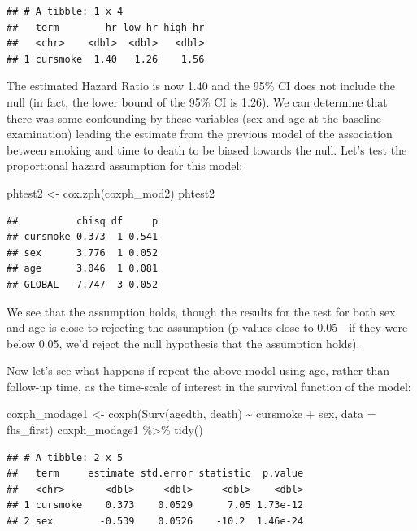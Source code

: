 \documentclass[
]{book}
\newenvironment{Shaded}{\begin{snugshade}}{\end{snugshade}}
\newcommand{\AttributeTok}[1]{\textcolor[rgb]{0.77,0.63,0.00}{#1}}
\newcommand{\FunctionTok}[1]{\textcolor[rgb]{0.00,0.00,0.00}{#1}}
\newcommand{\NormalTok}[1]{#1}
\newcommand{\OtherTok}[1]{\textcolor[rgb]{0.56,0.35,0.01}{#1}}
\newcommand{\SpecialCharTok}[1]{\textcolor[rgb]{0.00,0.00,0.00}{#1}}
\begin{document}
\begin{verbatim}
## # A tibble: 1 x 4
##   term        hr low_hr high_hr
##   <chr>    <dbl>  <dbl>   <dbl>
## 1 cursmoke  1.40   1.26    1.56
\end{verbatim}

The estimated Hazard Ratio is now 1.40 and the 95\% CI does not include the null (in fact, the lower bound of the 95\% CI is 1.26). We can determine that there was some confounding by these variables (sex and age at the baseline examination) leading the estimate from the previous model of the association between smoking and time to death to be biased towards the null. Let's test the proportional hazard assumption for this model:

\begin{Shaded}
\begin{Highlighting}[]
\NormalTok{phtest2 }\OtherTok{\textless{}{-}} \FunctionTok{cox.zph}\NormalTok{(coxph\_mod2)}
\NormalTok{phtest2}
\end{Highlighting}
\end{Shaded}

\begin{verbatim}
##          chisq df     p
## cursmoke 0.373  1 0.541
## sex      3.776  1 0.052
## age      3.046  1 0.081
## GLOBAL   7.747  3 0.052
\end{verbatim}

We see that the assumption holds, though the results for the test for both sex and age is close to rejecting the assumption (p-values close to 0.05---if they were below 0.05, we'd reject the null hypothesis that the assumption holds).

Now let's see what happens if repeat the above model using age, rather than follow-up time, as the time-scale of interest in the survival function of the model:

\begin{Shaded}
\begin{Highlighting}[]
\NormalTok{coxph\_modage1 }\OtherTok{\textless{}{-}} \FunctionTok{coxph}\NormalTok{(}\FunctionTok{Surv}\NormalTok{(agedth, death) }\SpecialCharTok{\textasciitilde{}}\NormalTok{ cursmoke }\SpecialCharTok{+}\NormalTok{ sex, }\AttributeTok{data =}\NormalTok{ fhs\_first)}
\NormalTok{coxph\_modage1 }\SpecialCharTok{\%\textgreater{}\%}
  \FunctionTok{tidy}\NormalTok{()}
\end{Highlighting}
\end{Shaded}

\begin{verbatim}
## # A tibble: 2 x 5
##   term     estimate std.error statistic  p.value
##   <chr>       <dbl>     <dbl>     <dbl>    <dbl>
## 1 cursmoke    0.373    0.0529      7.05 1.73e-12
## 2 sex        -0.539    0.0526    -10.2  1.46e-24
\end{verbatim}
\end{document}
